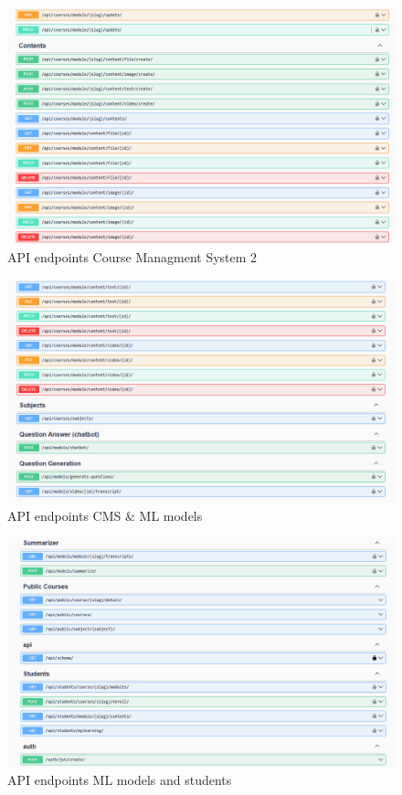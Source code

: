 \begin{figure}[h!]
	\centering
	\includegraphics[max height=\textheight,max width=\textwidth]{figures/swagger2.png}
	\caption{API endpoints Course Managment System 2}
\end{figure}
	
\begin{figure}[h!]
	\centering
	\includegraphics[max height=\textheight,max width=\textwidth]{figures/swagger3.png}
	\caption{API endpoints CMS \& ML models}
\end{figure}
	
\begin{figure}[h!]
	\centering
	\includegraphics[max height=\textheight,max width=\textwidth]{figures/swagger4.png}
	\caption{API endpoints ML models and students}
\end{figure}

